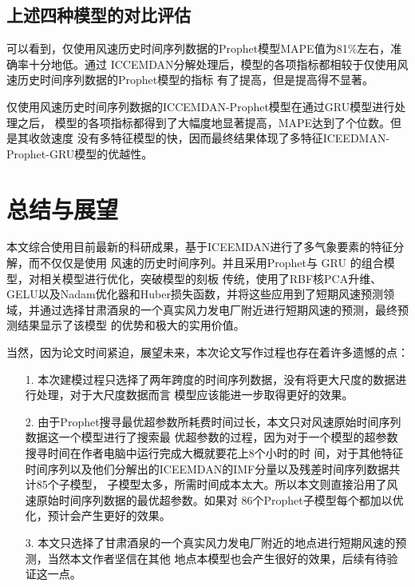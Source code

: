 \documentclass[AutoFakeBold]{LZUThesis}
\begin{document}
\section{上述四种模型的对比评估}

可以看到，仅使用风速历史时间序列数据的Prophet模型MAPE值为81\%左右，准确率十分地低。通过
ICCEMDAN分解处理后，模型的各项指标都相较于仅使用风速历史时间序列数据的Prophet模型的指标
有了提高，但是提高得不显著。

仅使用风速历史时间序列数据的ICCEMDAN-Prophet模型在通过GRU模型进行处理之后，
模型的各项指标都得到了大幅度地显著提高，MAPE达到了个位数。但是其收敛速度
没有多特征模型的快，因而最终结果体现了多特征ICEEDMAN-Prophet-GRU模型的优越性。

\chapter{总结与展望}

本文综合使用目前最新的科研成果，基于ICEEMDAN进行了多气象要素的特征分解，而不仅仅是使用
风速的历史时间序列。并且采用Prophet与 GRU 的组合模型，对相关模型进行优化，突破模型的刻板
传统，使用了RBF核PCA升维、GELU以及Nadam优化器和Huber损失函数，并将这些应用到了短期风速预测领
域，并通过选择甘肃酒泉的一个真实风力发电厂附近进行短期风速的预测，最终预测结果显示了该模型
的优势和极大的实用价值。

当然，因为论文时间紧迫，展望未来，本次论文写作过程也存在着许多遗憾的点：

\begin{itemize}
\item[1.] 本次建模过程只选择了两年跨度的时间序列数据，没有将更大尺度的数据进行处理，对于大尺度数据而言
模型应该能进一步取得更好的效果。
\item[2.] 由于Prophet搜寻最优超参数所耗费时间过长，本文只对风速原始时间序列数据这一个模型进行了搜索最
优超参数的过程，因为对于一个模型的超参数搜寻时间在作者电脑中运行完成大概就要花上8个小时的时
间，对于其他特征时间序列以及他们分解出的ICEEMDAN的IMF分量以及残差时间序列数据共计85个子模型，
子模型太多，所需时间成本太大。所以本文则直接沿用了风速原始时间序列数据的最优超参数。如果对
86个Prophet子模型每个都加以优化，预计会产生更好的效果。
\item[3.] 本文只选择了甘肃酒泉的一个真实风力发电厂附近的地点进行短期风速的预测，当然本文作者坚信在其他
地点本模型也会产生很好的效果，后续有待验证这一点。
\end{itemize}

\backmatter


\printbib
\end{document}
